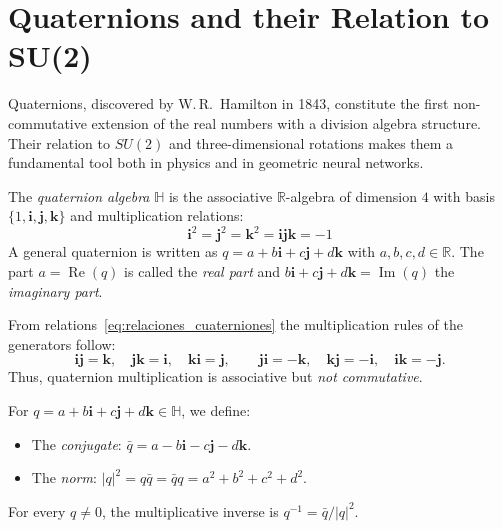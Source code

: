 \section{Quaternions and their Relation to SU(2)}\label{sec:cuaterniones}

Quaternions, discovered by W.\,R.\ Hamilton in 1843, constitute the first non-commutative extension of the real numbers with a division algebra structure. Their relation to $SU(2)$ and three-dimensional rotations makes them a fundamental tool both in physics and in geometric neural networks.

\begin{definition}\label{def:cuaterniones}
The \textit{quaternion algebra} $\mathbb{H}$ is the associative $\mathbb{R}$-algebra of dimension $4$ with basis $\{1, \mathbf{i}, \mathbf{j}, \mathbf{k}\}$ and multiplication relations:
\begin{equation}\label{eq:relaciones_cuaterniones}
\mathbf{i}^2 = \mathbf{j}^2 = \mathbf{k}^2 = \mathbf{i}\mathbf{j}\mathbf{k} = -1
\end{equation}
A general quaternion is written as $q = a + b\mathbf{i} + c\mathbf{j} + d\mathbf{k}$ with $a, b, c, d \in \mathbb{R}$. The part $a = \operatorname{Re}(q)$ is called the \textit{real part} and $b\mathbf{i} + c\mathbf{j} + d\mathbf{k} = \operatorname{Im}(q)$ the \textit{imaginary part}.
\end{definition}

From relations~\eqref{eq:relaciones_cuaterniones} the multiplication rules of the generators follow:
\[
\mathbf{i}\mathbf{j} = \mathbf{k}, \quad \mathbf{j}\mathbf{k} = \mathbf{i}, \quad \mathbf{k}\mathbf{i} = \mathbf{j}, \qquad \mathbf{j}\mathbf{i} = -\mathbf{k}, \quad \mathbf{k}\mathbf{j} = -\mathbf{i}, \quad \mathbf{i}\mathbf{k} = -\mathbf{j}.
\]
Thus, quaternion multiplication is associative but \emph{not commutative}.

\begin{definition}\label{def:conjugacion_norma_cuaterniones}
For $q = a + b\mathbf{i} + c\mathbf{j} + d\mathbf{k} \in \mathbb{H}$, we define:
\begin{itemize}
    \item The \textit{conjugate}: $\bar{q} = a - b\mathbf{i} - c\mathbf{j} - d\mathbf{k}$.
    \item The \textit{norm}: $|q|^2 = q\bar{q} = \bar{q}q = a^2 + b^2 + c^2 + d^2$.
\end{itemize}
For every $q \neq 0$, the multiplicative inverse is $q^{-1} = \bar{q}/|q|^2$.
\end{definition}

